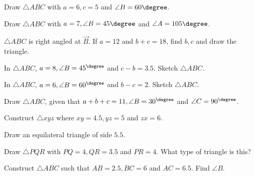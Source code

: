 \item Draw $\triangle ABC$ with $a = 6, c = 5$ and $\angle B = 60 \degree$. 
\\
\solution


\item Draw $\triangle ABC$ with $a = 7, \angle B = 45\degree$ and $\angle A = 105 \degree$. 
\\
\solution


\item $\triangle ABC$ is right angled at $\vec{B}$.  If $a = 12$ and $b+c = 18$, find $b,c$ and draw the triangle.
\\
\solution

\item In $\triangle ABC$,  $a = 8, \angle B = 45^{\degree}$ and $c-b = 3.5$.
Sketch $\triangle ABC$.
\\
\solution


\item In $\triangle ABC$,  $a = 6, \angle B = 60^{\degree}$ and $b-c = 2$. 
Sketch $\triangle ABC$.

\item Draw $\triangle ABC$,  given that $a+b+c = 11, \angle B = 30^{\degree}$ and $\angle C = 90^{\degree}$.
\\
\solution


\item Construct $\triangle xyz$ where $xy = 4.5, yz = 5$ and $zx = 6$.
\\
\solution


\item Draw an equilateral triangle of side $5.5$.
\\
\solution


\item Draw $\triangle PQR$ with $PQ = 4, QR = 3.5$ and $PR = 4$.  What type of triangle is this?
\\
\solution


\item Construct $\triangle ABC$ such that $AB = 2.5, BC = 6$ and $AC = 6.5$.  Find $\angle B$.
\\
\solution



